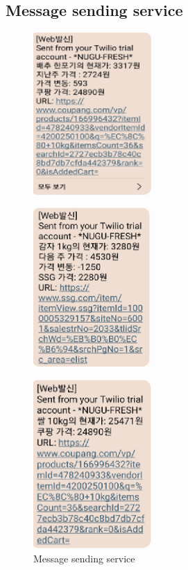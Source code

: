 \documentclass[conference]{IEEEtran}
\begin{document}
\subsection{Message sending service}
\begin{figure}[h]
\centering
    \includegraphics[width =4.5cm]{pictures/M1.eps}
    \hfil
\end{figure}

\begin{figure}[h]
\centering
    \includegraphics[width =4.5cm]{pictures/M2.eps}
    \hfil
\end{figure}
\begin{figure}[h]
\centering
    \includegraphics[width =4.5cm]{pictures/M3.eps}
    \hfil
\caption{Message sending service}
\end{figure}
\newpage
\end{document}
